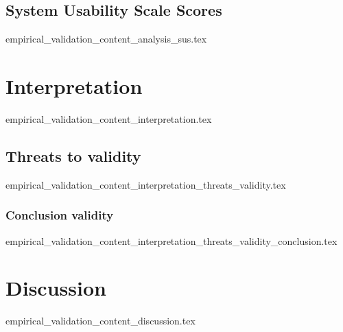 \subsection{System Usability Scale Scores}
  {empirical_validation_content_analysis_sus.tex}

\section{Interpretation}\label{sub:interpretation}
  {empirical_validation_content_interpretation.tex}

\subsection{Threats to validity}
  {empirical_validation_content_interpretation_threats_validity.tex}

\subsubsection{Conclusion validity}
  {empirical_validation_content_interpretation_threats_validity_conclusion.tex}

\section{Discussion}
  {empirical_validation_content_discussion.tex}
